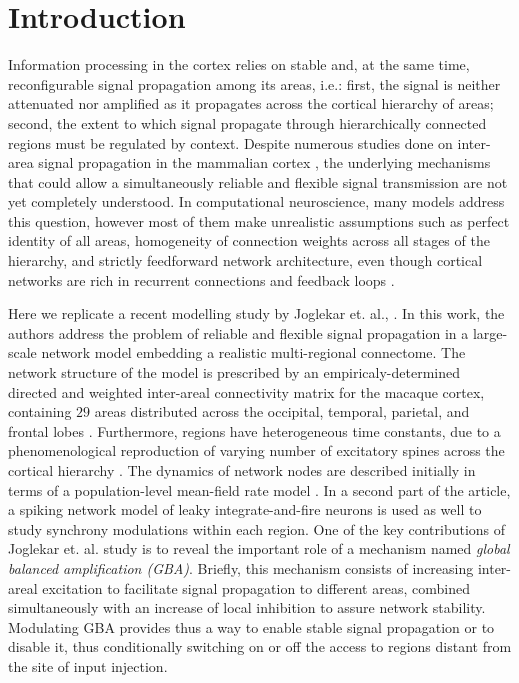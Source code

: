 \setlength{\parindent}{1cm} %

\section{Introduction}\label{introduction}

Information processing in the cortex relies on stable and, at the same time, reconfigurable signal propagation among its areas, i.e.: first, the signal is neither attenuated nor amplified as it propagates across the cortical hierarchy of areas; second, the extent to which signal propagate through hierarchically connected regions must be regulated by context. Despite numerous studies done on inter-area signal propagation in the mammalian cortex \cite{van2002fast, kumar2008conditions,kumar2010spiking}, the underlying mechanisms that could allow a simultaneously reliable and flexible signal transmission are not yet completely understood. In computational neuroscience, many models address this question, however most of them make  unrealistic assumptions such as perfect identity of all areas, homogeneity of connection weights across all stages of the hierarchy, and strictly feedforward network architecture,  even though cortical networks are rich in recurrent connections and feedback loops \cite{markov2014b}.

\indent Here we replicate a recent modelling study by Joglekar et. al., \cite{joglekar2018inter}. In this work, the authors address the problem of reliable and flexible signal propagation in a large-scale network model embedding a realistic multi-regional connectome. The network structure of the model is prescribed by an empiricaly-determined directed and weighted inter-areal connectivity matrix for the macaque cortex, containing $29$ areas distributed across the occipital, temporal, parietal, and frontal lobes \cite{markov2014b}. Furthermore, regions have heterogeneous time constants, due to a phenomenological reproduction of varying number of excitatory spines across the cortical hierarchy \cite{Elston2007}. The dynamics of network nodes are described initially in terms of a population-level mean-field rate model \cite{chaudhuri2015large,mejias2016feedforward}. In a second part of the article, a spiking network model of leaky integrate-and-fire neurons is used as well to study synchrony modulations within each region.  One of the key contributions of Joglekar et. al. \cite{joglekar2018inter} study is to reveal the important role of a mechanism named \emph{global balanced amplification (GBA)}. Briefly, this mechanism consists of increasing inter-areal excitation to facilitate signal propagation to different areas, combined simultaneously with an increase of local inhibition to assure network stability. Modulating GBA provides thus a way to enable stable signal propagation or to disable it, thus conditionally switching on or off the access to regions distant from the site of input injection.

